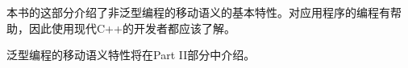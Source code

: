 本书的这部分介绍了非泛型编程的移动语义的基本特性。对应用程序的编程有帮助，因此使用现代C++的开发者都应该了解。\par

泛型编程的移动语义特性将在Part II部分中介绍。\par

\newpage